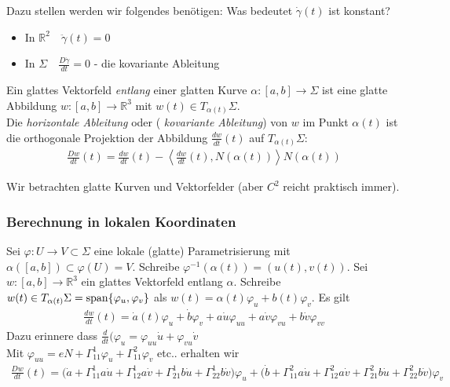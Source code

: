 \documentclass[../main.tex]{subfiles}
\begin{document}
\begin{question}
Dazu stellen werden wir folgendes benötigen: Was bedeutet $\dot{\gamma}(t)$ ist konstant?
\begin{itemize}
    \item In $\mathbb{R}^2 \quad \ddot{\gamma}(t)=0$
    \item In $\Sigma \quad \frac{D\dot{\gamma}}{dt}=0$ - die kovariante Ableitung
\end{itemize}
\end{question}

\begin{definition}
Ein glattes Vektorfeld \emph{entlang} einer glatten Kurve $\alpha : [a,b] \to \Sigma$ ist eine glatte Abbildung $w : [a,b] \to \mathbb{R}^3$ mit $w(t) \in T_{\alpha(t)}\Sigma$. \\
Die \emph{horizontale Ableitung} oder ( \emph{kovariante Ableitung}) von $w$ im Punkt $\alpha(t)$ ist die orthogonale Projektion der Abbildung $\frac{dw}{dt}(t)$ auf $T_{\alpha(t)}\Sigma :$
\begin{align*}
    \frac{Dw}{dt}(t) = \frac{dw}{dt}(t) - \left\langle \frac{dw}{dt}(t), N(\alpha(t))\right\rangle N(\alpha(t))
\end{align*}
\begin{figure}[H]
    \centering
    \def\svgwidth{15em}
    
\end{figure}
\end{definition}

\begin{remark}
Wir betrachten glatte Kurven und Vektorfelder (aber $C^2$ reicht praktisch immer).
\end{remark}

\subsubsection*{Berechnung in lokalen Koordinaten}
Sei $\varphi : U \to V \subset \Sigma$ eine lokale (glatte) Parametrisierung mit $\alpha([a,b]) \subset \varphi (U) = V$. Schreibe $\varphi^{-1}(\alpha(t))=(u(t),v(t))$.
Sei $w:[a,b]\to \mathbb{R}^3$ ein glattes Vektorfeld entlang $\alpha$. Schreibe $w(t) \in T_{\alpha(t)}\Sigma = \operatorname{span} \{ \varphi_u, \varphi_v \}$
als $w(t) = \alpha(t)\varphi_u + b(t)\varphi_v$. Es gilt
\begin{align*}
    \frac{dw}{dt}(t) = \dot{a}(t)\varphi_u + \dot{b}\varphi_v + a\dot{u}\varphi_{uu} + a\dot{v}\varphi_{vu} + b\dot{v}\varphi_{vv}
\end{align*}
Dazu erinnere dass $\frac{d}{dt}(\varphi_u = \varphi_{uu}\dot{u} + \varphi_{vu}\dot{v}$
\\
Mit $\varphi_{uu} = eN + \Gamma^1_{11}\varphi_u + \Gamma^2_{11}\varphi_v$ etc.. erhalten wir
\begin{align*}
    \frac{Dw}{dt}(t) = \big(\dot{a} + \Gamma^1_{11}a\dot{u} + \Gamma^1_{12}a\dot{v} + \Gamma^1_{21}b\dot{u} + \Gamma^1_{22}b\dot{v}\big) \varphi_u + \big(\dot{b} + \Gamma^2_{11}a\dot{u} + \Gamma^2_{12}a\dot{v} + \Gamma^2_{21}b\dot{u} + \Gamma^2_{22}b\dot{v}\big) \varphi_v
\end{align*}
\end{document}

